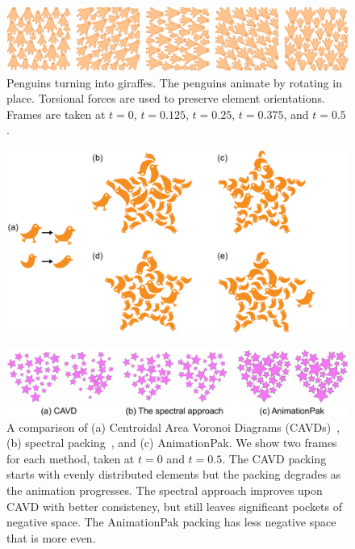 \begin{figure}
\centering
\includegraphics[width=1.0\textwidth]{figures/animationpak/penguin_giraffe.pdf} 
\caption[An animated packing of the penguins-to-giraffes illusion]
{\label{fig_animationpak_penguin_giraffe} 
Penguins turning into giraffes.  The penguins animate by rotating in place.
Torsional forces are used to preserve element orientations.
Frames are taken at $t=0$, $t=0.125$, $t=0.25$, $t=0.375$, and $t=0.5$. 
}
\end{figure}


\begin{figure}
\centering
\includegraphics[width=1.0\textwidth]{figures/animationpak/birb_entering_star.pdf} 
\caption[An unconfined bird enters a packing of smaller birds inside a star]
{\label{fig_bib_entering_star} 
}
\end{figure}

\begin{figure}
\centering
\includegraphics[width=1.0\textwidth]{figures/animationpak/star_comparison.pdf} 
\caption[An comparison between CAVD, The spectral approach, and AnimationPak]
{\label{fig_animationpak_star_comparison} 
A comparison of (a) Centroidal Area Voronoi Diagrams (CAVDs)~\cite{Smith2005}, 
(b) spectral packing~\cite{Dalal2006}, and (c) AnimationPak. 
We show two frames for each method, taken at $t = 0$ and $t = 0.5$. 
The CAVD packing starts with evenly distributed elements
but the packing degrades as the animation progresses.
The spectral approach improves upon CAVD with better consistency, 
but still leaves significant pockets of negative space.
The AnimationPak packing has less negative space that is more even.}
\end{figure}


